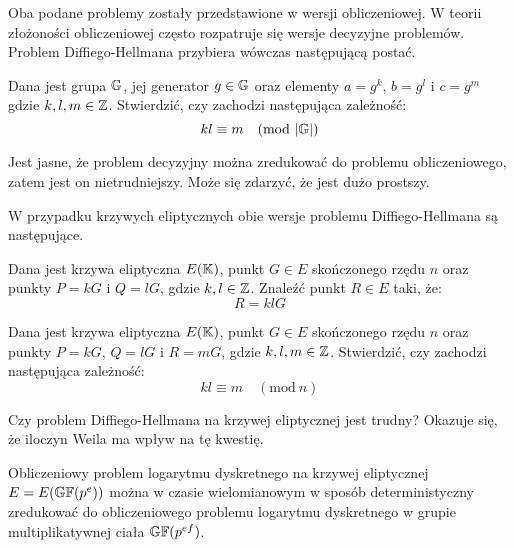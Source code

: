 \noindent
Oba podane problemy zostały przedstawione w wersji obliczeniowej.
W teorii złożoności obliczeniowej często rozpatruje się wersje decyzyjne
problemów. Problem Diffiego-Hellmana przybiera wówczas następującą postać.

\begin{problem}
Dana jest grupa $\mathbb{G}$,
jej generator $g \in \mathbb{G}$
oraz elementy $a = g^k$, $b = g^l$ i $c = g^m$
gdzie $k, l, m \in \mathbb{Z}$.
Stwierdzić, czy zachodzi następująca zależność:
\begin{equation}
kl \equiv m \quad (\mathrm{mod}\ \lvert\mathbb{G}\rvert)
\end{equation}
\end{problem}

\noindent
Jest jasne, że problem decyzyjny można zredukować do problemu obliczeniowego,
zatem jest on nietrudniejszy. Może się zdarzyć, że jest dużo prostszy.

\noindent
W przypadku krzywych eliptycznych obie wersje problemu Diffiego-Hellmana
są następujące.

\begin{problem}
Dana jest krzywa eliptyczna $E(\mathbb{K})$,
punkt $G \in E$ skończonego rzędu $n$
oraz punkty $P = kG$ i $Q = lG$,
gdzie $k, l \in \mathbb{Z}$.
Znaleźć punkt $R \in E$ taki, że:
\begin{equation}
R = klG
\end{equation}
\end{problem}

\begin{problem}
Dana jest krzywa eliptyczna $E(\mathbb{K})$,
punkt $G \in E$ skończonego rzędu $n$
oraz punkty $P = kG$, $Q = lG$ i $R = mG$,
gdzie $k, l, m \in \mathbb{Z}$.
Stwierdzić, czy zachodzi następująca zależność:
\begin{equation}
kl \equiv m \quad (\mathrm{mod}\ n)
\end{equation}
\end{problem}

\noindent
Czy problem Diffiego-Hellmana na krzywej eliptycznej jest trudny?
Okazuje się, że iloczyn Weila ma wpływ na tę kwestię.

\begin{theorem}
Obliczeniowy problem logarytmu dyskretnego
na krzywej eliptycznej $E = E(\mathbb{GF}(p^e))$
można w czasie wielomianowym w sposób deterministyczny zredukować
do obliczeniowego problemu logarytmu dyskretnego
w grupie multiplikatywnej ciała $\mathbb{GF}(p^{ef})$.
\end{theorem}

